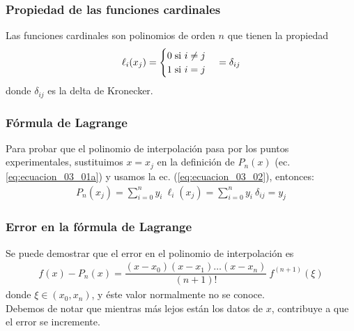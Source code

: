 \begin{frame}
\frametitle{Propiedad de las funciones cardinales}
Las funciones cardinales son polinomios de orden $n$ que tienen la propiedad
\begin{align}
\ell_{i} (x_{j}) = \begin{cases} 0 \hspace{0.1cm} \mbox{si } i \neq j \\ 
1 \hspace{0.1cm} \mbox{si } i = j \end{cases} = \delta_{ij}
\label{eq:ecuacion_03_02}
\end{align}
donde $\delta_{ij}$ es la delta de Kronecker.
\end{frame}
\begin{frame}
\frametitle{Fórmula de Lagrange}
Para probar que el polinomio de interpolación pasa por los puntos experimentales, sustituimos $x = x_{j}$ en la definición de $P_{n}(x)$ (ec. \ref{eq:ecuacion_03_01a}) y usamos la ec. (\ref{eq:ecuacion_03_02}), entonces:
\begin{align*}
P_{n}(x_{j}) = \sum_{i = 0}^{n} y_{i} \: \ell_{i}(x_{j}) = \sum_{i = 0}^{n} y_{i} \: \delta_{ij} = y_{j}
\end{align*}
\end{frame}
\begin{frame}
\frametitle{Error en la fórmula de Lagrange}
Se puede demostrar que el error en el polinomio de interpolación es
\begin{align*}
f(x) - P_{n}(x) = \dfrac{(x - x_{0})(x - x_{1}) \ldots (x - x_{n})}{(n + 1)!} \: f^{(n+1)}(\xi)
\end{align*}
donde $\xi \in (x_{0},x_{n})$, y éste valor normalmente no se conoce. 
\\
\bigskip
Debemos de notar que mientras más lejos están los datos de $x$, contribuye a que el error se incremente. 
\end{frame}
